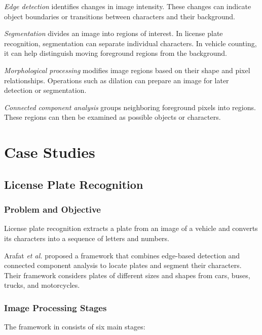 \documentclass[conference]{IEEEtran}
\begin{document}
	\textit{Edge detection} identifies changes in image intensity. These
	changes can indicate object boundaries or transitions between
	characters and their background.
	
	\textit{Segmentation} divides an image into regions of interest. In
	license plate recognition, segmentation can separate individual
	characters. In vehicle counting, it can help distinguish moving
	foreground regions from the background.
	
	\textit{Morphological processing} modifies image regions based on their
	shape and pixel relationships. Operations such as dilation can prepare
	an image for later detection or segmentation.
	
	\textit{Connected component analysis} groups neighboring foreground
	pixels into regions. These regions can then be examined as possible
	objects or characters.
	

	
	\section{Case Studies}
	
	\subsection{License Plate Recognition}
	
	\subsubsection{Problem and Objective}
	
	License plate recognition extracts a plate from an image of a vehicle
	and converts its characters into a sequence of letters and numbers.
	
	Arafat \textit{et al.} \cite{arafat2020} proposed a framework that
	combines edge-based detection and connected component analysis to
	locate plates and segment their characters. Their framework considers
	plates of different sizes and shapes from cars, buses, trucks, and
	motorcycles.
	
	\subsubsection{Image Processing Stages}
	
	The framework in \cite{arafat2020} consists of six main stages:
	
\end{document}
